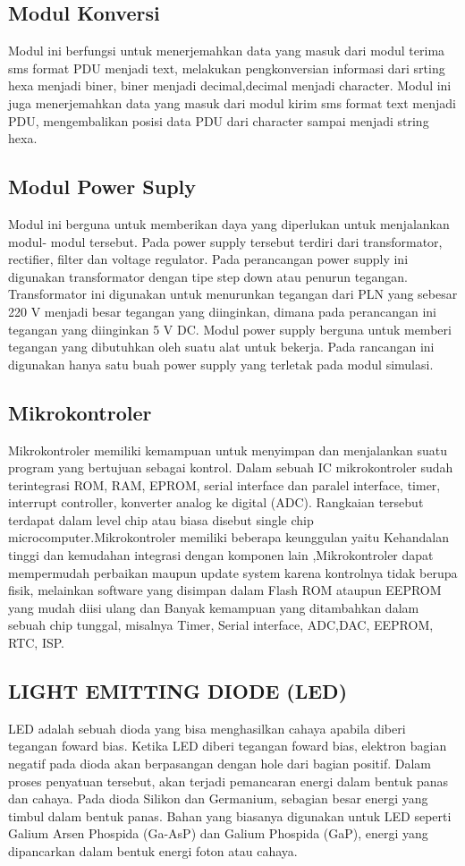 \documentclass[12pt,a4paper]{article}
\begin{document}
\subsection{ Modul Konversi}
Modul ini berfungsi untuk menerjemahkan data yang masuk dari modul terima sms  format PDU menjadi  text,  melakukan pengkonversian informasi dari srting hexa menjadi biner, biner menjadi decimal,decimal menjadi character. Modul ini juga menerjemahkan data yang masuk  dari modul kirim sms format text menjadi PDU, mengembalikan posisi data PDU dari character sampai menjadi string hexa. 
\subsection{Modul Power Suply}
Modul ini berguna untuk memberikan daya yang diperlukan untuk menjalankan modul- modul tersebut. Pada power supply tersebut terdiri dari transformator, rectifier, filter dan voltage regulator. Pada perancangan power supply ini digunakan transformator dengan tipe step down atau penurun tegangan. Transformator ini digunakan untuk menurunkan tegangan dari PLN yang sebesar 220 V menjadi besar tegangan yang diinginkan, dimana pada perancangan ini tegangan yang diinginkan 5 V DC. Modul power supply berguna untuk memberi tegangan yang dibutuhkan oleh suatu alat untuk bekerja. Pada rancangan ini digunakan hanya satu buah power supply yang terletak pada modul simulasi.
\subsection{Mikrokontroler}
Mikrokontroler memiliki kemampuan untuk menyimpan dan menjalankan suatu program yang bertujuan sebagai kontrol.
Dalam sebuah IC mikrokontroler sudah terintegrasi ROM, RAM, EPROM, serial interface dan paralel
interface, timer, interrupt controller, konverter analog ke digital (ADC). Rangkaian tersebut terdapat dalam level chip atau biasa disebut single chip microcomputer.Mikrokontroler memiliki beberapa keunggulan yaitu Kehandalan tinggi dan kemudahan integrasi dengan komponen lain ,Mikrokontroler dapat mempermudah perbaikan maupun update system karena kontrolnya tidak berupa fisik,
melainkan software yang disimpan dalam Flash ROM ataupun EEPROM yang mudah diisi ulang dan Banyak kemampuan yang ditambahkan dalam sebuah chip tunggal, misalnya Timer, Serial interface, ADC,DAC, EEPROM, RTC, ISP.
\subsection{LIGHT EMITTING DIODE (LED)}
LED adalah sebuah dioda yang bisa menghasilkan cahaya apabila diberi tegangan foward bias. Ketika LED diberi tegangan foward bias, elektron bagian negatif pada dioda akan berpasangan dengan hole dari bagian positif. 
Dalam proses penyatuan tersebut, akan terjadi pemancaran energi dalam bentuk panas dan cahaya. Pada dioda Silikon dan Germanium, sebagian besar energi yang timbul dalam bentuk panas. Bahan yang biasanya digunakan untuk LED seperti Galium Arsen Phospida (Ga-AsP) dan Galium Phospida (GaP), energi yang dipancarkan dalam bentuk energi foton atau cahaya.
\end{document}
